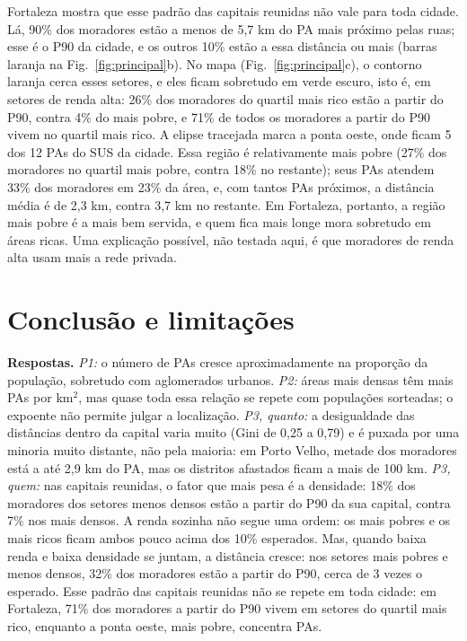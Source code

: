 \documentclass[10pt,a4paper,twocolumn]{article}
\begin{document}
Fortaleza mostra que esse padrão das capitais reunidas não vale para toda cidade. Lá, 90\% dos moradores estão a menos de 5{,}7 km do PA mais próximo pelas ruas; esse é o P90 da cidade, e os outros 10\% estão a essa distância ou mais (barras laranja na Fig.~\ref{fig:principal}b). No mapa (Fig.~\ref{fig:principal}c), o contorno laranja cerca esses setores, e eles ficam sobretudo em verde escuro, isto é, em setores de renda alta: 26\% dos moradores do quartil mais rico estão a partir do P90, contra 4\% do mais pobre, e 71\% de todos os moradores a partir do P90 vivem no quartil mais rico. A elipse tracejada marca a ponta oeste, onde ficam 5 dos 12 PAs do SUS da cidade. Essa região é relativamente mais pobre (27\% dos moradores no quartil mais pobre, contra 18\% no restante); seus PAs atendem 33\% dos moradores em 23\% da área, e, com tantos PAs próximos, a distância média é de 2{,}3 km, contra 3{,}7 km no restante. Em Fortaleza, portanto, a região mais pobre é a mais bem servida, e quem fica mais longe mora sobretudo em áreas ricas. Uma explicação possível, não testada aqui, é que moradores de renda alta usam mais a rede privada.

\section{Conclusão e limitações}
\textbf{Respostas.} \emph{P1:} o número de PAs cresce aproximadamente na proporção da população, sobretudo com aglomerados urbanos. \emph{P2:} áreas mais densas têm mais PAs por km$^2$, mas quase toda essa relação se repete com populações sorteadas; o expoente não permite julgar a localização. \emph{P3, quanto:} a desigualdade das distâncias dentro da capital varia muito (Gini de 0{,}25 a 0{,}79) e é puxada por uma minoria muito distante, não pela maioria: em Porto Velho, metade dos moradores está a até 2{,}9 km do PA, mas os distritos afastados ficam a mais de 100 km. \emph{P3, quem:} nas capitais reunidas, o fator que mais pesa é a densidade: 18\% dos moradores dos setores menos densos estão a partir do P90 da sua capital, contra 7\% nos mais densos. A renda sozinha não segue uma ordem: os mais pobres e os mais ricos ficam ambos pouco acima dos 10\% esperados. Mas, quando baixa renda e baixa densidade se juntam, a distância cresce: nos setores mais pobres e menos densos, 32\% dos moradores estão a partir do P90, cerca de 3 vezes o esperado. Esse padrão das capitais reunidas não se repete em toda cidade: em Fortaleza, 71\% dos moradores a partir do P90 vivem em setores do quartil mais rico, enquanto a ponta oeste, mais pobre, concentra PAs.
\end{document}
